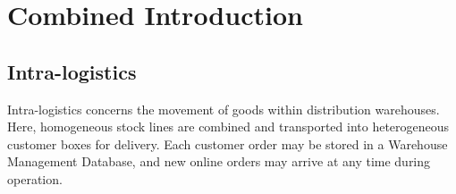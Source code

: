 \chapter{Combined Introduction}
\section{Intra-logistics}
Intra-logistics concerns the movement of goods within distribution warehouses. Here, homogeneous stock lines are combined and transported into heterogeneous customer boxes for delivery. Each customer order may be stored in a Warehouse Management Database, and new online orders may arrive at any time during operation. 
